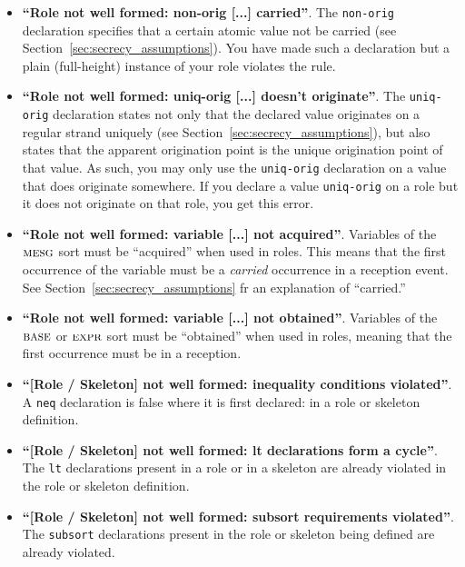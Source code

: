 \begin{itemize}
\item \textbf{``Role not well formed: non-orig [...] carried''}.  The \texttt{non-orig}
  declaration specifies that a certain atomic value not be carried
  (see Section~\ref{sec:secrecy_assumptions}).  You have made such a declaration but a
  plain (full-height) instance of your role violates the rule.

  \item \textbf{``Role not well formed: uniq-orig [...] doesn't
    originate''}.  The \texttt{uniq-orig} declaration states not only
  that the declared value originates on a regular strand uniquely (see
  Section~\ref{sec:secrecy_assumptions}), but also states that the
  apparent origination point is the unique origination point of that
  value.  As such, you may only use the \texttt{uniq-orig} declaration
  on a value that does originate somewhere.  If you declare a value
  \texttt{uniq-orig} on a role but it does not originate on that role,
  you get this error.

\item \textbf{``Role not well formed: variable [...] not acquired''}.
  Variables of the $\scap{mesg}$ sort must be ``acquired'' when used
  in roles.  This means that the first occurrence of the variable must
  be a \emph{carried} occurrence in a reception event.  See
  Section~\ref{sec:secrecy_assumptions} fr an explanation of
  ``carried.''

\item \textbf{``Role not well formed: variable [...] not obtained''}.
  Variables of the $\scap{base}$ or $\scap{expr}$ sort must be
  ``obtained'' when used in roles, meaning that the first occurrence
  must be in a reception.

\item \textbf{``[Role / Skeleton] not well formed: inequality
  conditions violated''}.  A \texttt{neq} declaration is false where
  it is first declared: in a role or skeleton definition.

\item \textbf{``[Role / Skeleton] not well formed: lt declarations form a cycle''}.  The
  \texttt{lt} declarations present in a role or in a skeleton are already violated in
  the role or skeleton definition.

\item \textbf{``[Role / Skeleton] not well formed: subsort requirements violated''}.  The
  \texttt{subsort} declarations present in the role or skeleton being defined are already
  violated.


\end{itemize}
